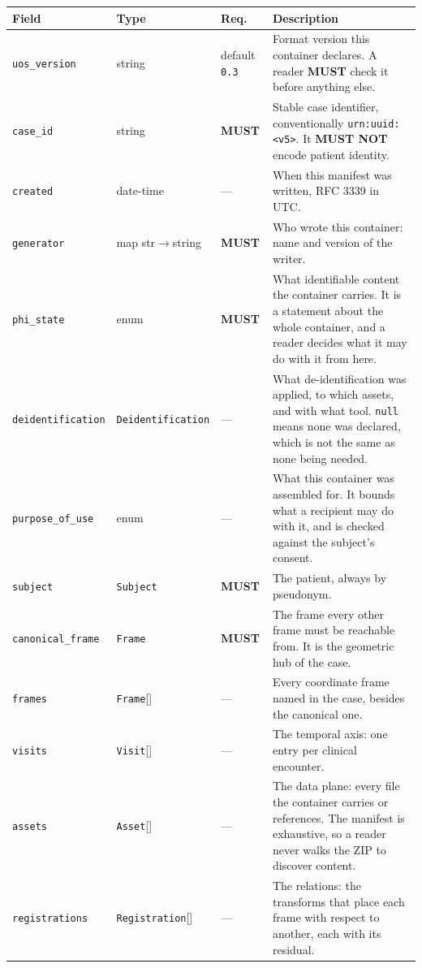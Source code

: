 \documentclass[11pt,a4paper]{article}
\newcommand{\MUST}{\textcolor{uosred}{\textbf{MUST}}}
\newcommand{\MUSTNOT}{\textcolor{uosred}{\textbf{MUST NOT}}}
\newcommand{\code}[1]{\texttt{\small #1}}
\begin{document}
\begin{longtable}{L{3.5cm} L{3.0cm} C{1.4cm} L{6.4cm}}
\toprule
\textbf{Field} & \textbf{Type} & \textbf{Req.} & \textbf{Description}\\
\midrule
\endhead
\code{uos\_version} & string & default \code{0.3} & Format version this container declares. A reader \MUST{} check it before anything else.\\
\code{case\_id} & string & \MUST{} & Stable case identifier, conventionally \code{urn:uuid:<v5>}. It \MUSTNOT{} encode patient identity.\\
\code{created} & date-time & --- & When this manifest was written, RFC 3339 in UTC.\\
\code{generator} & map str$\to$string & \MUST{} & Who wrote this container: name and version of the writer.\\
\code{phi\_state} & enum & \MUST{} & What identifiable content the container carries. It is a statement about the whole container, and a reader decides what it may do with it from here.\\
\code{deidentification} & \code{Deidentification} & --- & What de-identification was applied, to which assets, and with what tool. \code{null} means none was declared, which is not the same as none being needed.\\
\code{purpose\_of\_use} & enum & --- & What this container was assembled for. It bounds what a recipient may do with it, and is checked against the subject's consent.\\
\code{subject} & \code{Subject} & \MUST{} & The patient, always by pseudonym.\\
\code{canonical\_frame} & \code{Frame} & \MUST{} & The frame every other frame must be reachable from. It is the geometric hub of the case.\\
\code{frames} & \code{Frame}[] & --- & Every coordinate frame named in the case, besides the canonical one.\\
\code{visits} & \code{Visit}[] & --- & The temporal axis: one entry per clinical encounter.\\
\code{assets} & \code{Asset}[] & --- & The data plane: every file the container carries or references. The manifest is exhaustive, so a reader never walks the ZIP to discover content.\\
\code{registrations} & \code{Registration}[] & --- & The relations: the transforms that place each frame with respect to another, each with its residual.\\

\end{longtable}
\end{document}
